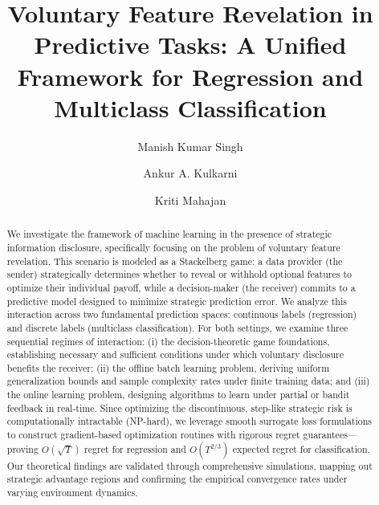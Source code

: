 \documentclass[acmsmall]{acmart}
\begin{document}
\title[Voluntary Feature Revelation]{Voluntary Feature Revelation in Predictive Tasks: A Unified Framework for Regression and Multiclass Classification}

\author{Manish Kumar Singh}

\author{Ankur A. Kulkarni}

\author{Kriti Mahajan}

\begin{abstract}
We investigate the framework of machine learning in the presence of strategic information disclosure, specifically focusing on the problem of voluntary feature revelation. This scenario is modeled as a Stackelberg game: a data provider (the sender) strategically determines whether to reveal or withhold optional features to optimize their individual payoff, while a decision-maker (the receiver) commits to a predictive model designed to minimize strategic prediction error. We analyze this interaction across two fundamental prediction spaces: continuous labels (regression) and discrete labels (multiclass classification). For both settings, we examine three sequential regimes of interaction: (i) the decision-theoretic game foundations, establishing necessary and sufficient conditions under which voluntary disclosure benefits the receiver; (ii) the offline batch learning problem, deriving uniform generalization bounds and sample complexity rates under finite training data; and (iii) the online learning problem, designing algorithms to learn under partial or bandit feedback in real-time. Since optimizing the discontinuous, step-like strategic risk is computationally intractable (NP-hard), we leverage smooth surrogate loss formulations to construct gradient-based optimization routines with rigorous regret guarantees—proving $O(\sqrt{T})$ regret for regression and $O(T^{2/3})$ expected regret for classification. Our theoretical findings are validated through comprehensive simulations, mapping out strategic advantage regions and confirming the empirical convergence rates under varying environment dynamics.
\end{abstract}
\end{document}
